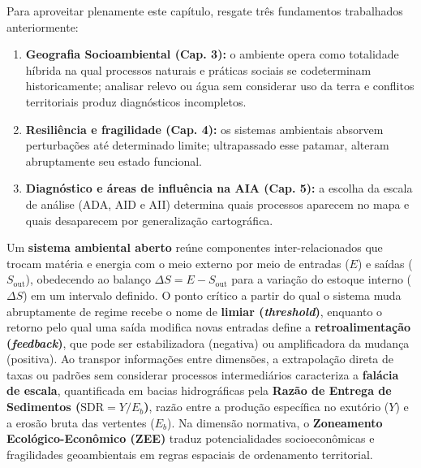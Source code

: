 \begin{capRevisao}
  Para aproveitar plenamente este capítulo, resgate três fundamentos trabalhados anteriormente:
  \begin{enumerate}[leftmargin=1.6em, itemsep=2.5pt]
    \item \textbf{Geografia Socioambiental (Cap. 3):} o ambiente opera como totalidade híbrida na qual processos naturais e práticas sociais se codeterminam historicamente; analisar relevo ou água sem considerar uso da terra e conflitos territoriais produz diagnósticos incompletos.
    \item \textbf{Resiliência e fragilidade (Cap. 4):} os sistemas ambientais absorvem perturbações até determinado limite; ultrapassado esse patamar, alteram abruptamente seu estado funcional.
    \item \textbf{Diagnóstico e áreas de influência na AIA (Cap. 5):} a escolha da escala de análise (ADA, AID e AII) determina quais processos aparecem no mapa e quais desaparecem por generalização cartográfica.
  \end{enumerate}
\end{capRevisao}


\begin{boxSimbolo}
  Um \textbf{sistema ambiental aberto} reúne componentes inter-relacionados que trocam matéria e energia com o meio externo por meio de entradas ($E$) e saídas ($S_{\text{out}}$), obedecendo ao balanço $\Delta S = E - S_{\text{out}}$ para a variação do estoque interno ($\Delta S$) em um intervalo definido. O ponto crítico a partir do qual o sistema muda abruptamente de regime recebe o nome de \textbf{limiar (\textit{threshold})}, enquanto o retorno pelo qual uma saída modifica novas entradas define a \textbf{retroalimentação (\textit{feedback})}, que pode ser estabilizadora (negativa) ou amplificadora da mudança (positiva). Ao transpor informações entre dimensões, a extrapolação direta de taxas ou padrões sem considerar processos intermediários caracteriza a \textbf{falácia de escala}, quantificada em bacias hidrográficas pela \textbf{Razão de Entrega de Sedimentos ($\text{SDR} = Y / E_b$)}, razão entre a produção específica no exutório ($Y$) e a erosão bruta das vertentes ($E_b$). Na dimensão normativa, o \textbf{Zoneamento Ecológico-Econômico (ZEE)} traduz potencialidades socioeconômicas e fragilidades geoambientais em regras espaciais de ordenamento territorial.
\end{boxSimbolo}

